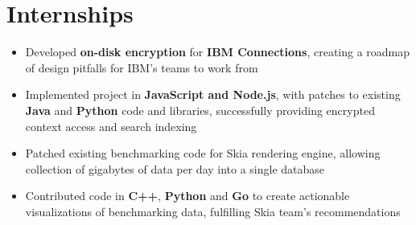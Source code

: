 \documentclass{my_resume}
\begin{document}
\section{Internships}
\begin{flushleft}
\begin{itemize}[noitemsep]
  \item Developed \textbf{on-disk encryption} for \textbf{IBM Connections}, creating a roadmap of design pitfalls for IBM's teams to work from
  \item Implemented project in \textbf{JavaScript and Node.js}, with patches to existing \textbf{Java} and \textbf{Python} code and libraries, successfully providing encrypted context access and search indexing
\end{itemize}
\end{flushleft}
\begin{flushleft}
\begin{itemize}[noitemsep]
  \item Patched existing benchmarking code for Skia rendering engine, allowing collection of gigabytes of data per day into a single database
  \item Contributed code in \textbf{C++}, \textbf{Python} and \textbf{Go} to create actionable visualizations of benchmarking data, fulfilling Skia team's recommendations
\end{itemize}
\end{flushleft}
\end{document}
